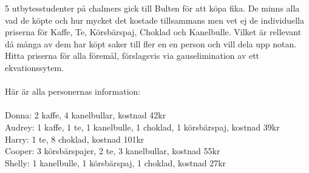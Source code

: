 5 utbytesstudenter på chalmers gick till Bulten för att köpa fika. De minns alla vad de köpte och hur mycket det kostade tillsammans men vet ej de individuella priserna för Kaffe, Te, Körsbärspaj, Choklad och Kanelbulle. Vilket är rellevant då många av dem har köpt saker till fler en en person och vill dela upp notan. Hitta priserna för alla föremål, förslagsvis via gauselimination av ett ekvationssytem.
\\\\
Här är alla personernas information:
\\\\
Donna: 2 kaffe, 4 kanelbullar, kostnad 42kr \\
Audrey: 1 kaffe, 1 te, 1 kanelbulle, 1 choklad, 1 körsbärspaj, kostnad 39kr \\
Harry: 1 te, 8 choklad, kostnad 101kr \\
Cooper: 3 körsbärspajer, 2 te, 3 kanelbullar, kostnad 55kr \\ 
Shelly: 1 kanelbulle, 1 körsbärspaj, 1 choklad, kostnad 27kr